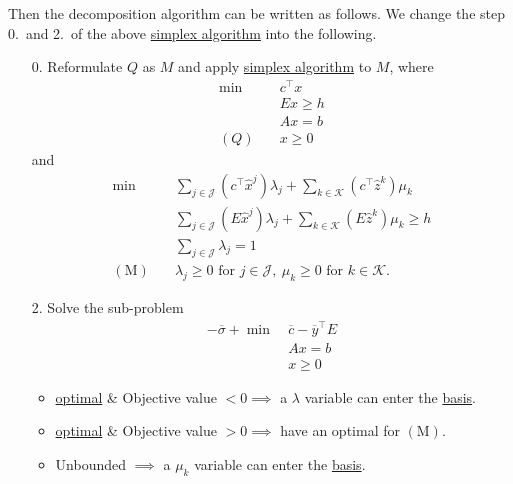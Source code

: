 Then the decomposition algorithm can be written as follows. We change the step 0.\ and 2.\ of the above \hyperref[algo:simplex-algorithm]{simplex algorithm} into the following.
\begin{enumerate}
	\item[0.] Reformulate \(Q\) as \(M\) and apply \hyperref[algo:simplex-algorithm]{simplex algorithm} to \(M\), where
		\[
			\begin{aligned}
				\min~    & c^{\top}x \\
				         & Ex \geq h \\
				         & Ax = b    \\
				(Q)\quad & x\geq 0
			\end{aligned}
		\]
		and
		\[
			\begin{aligned}
				\min~             & \sum\limits_{j\in\mathcal{J}}\left(c^{\top}\hat{x}^j\right)\lambda_{j} + \sum\limits_{k\in\mathcal{K}}\left(c^{\top} \hat{z}^k  \right)\mu_k \\
				                  & \sum\limits_{j\in\mathcal{J}}\left(E\hat{x}^j\right)\lambda_{j} + \sum\limits_{k\in\mathcal{K}}\left(E \hat{z}^k \right)\mu_k \geq h         \\
				                  & \sum\limits_{j\in\mathcal{J}}\lambda_{j} = 1                                                                                                 \\
				(\mathrm{M})\quad & \lambda_{j}\geq 0 \text{ for }j\in\mathcal{J},\ \mu_k\geq 0 \text{ for }k\in\mathcal{K}.
			\end{aligned}
		\]
	\item[2.] Solve the sub-problem
		\[
			\begin{aligned}
				-\overline{\sigma}+\min~ & \overline{c} - \overline{y}^{\top}E \\
				                         & Ax = b                              \\
				                         & x\geq 0
			\end{aligned}
		\]
		\begin{itemize}
			\item \hyperref[def:optimal-solution]{optimal} \& Objective value \(<0 \implies\) a \(\lambda\) variable can enter the \hyperref[def:basis]{basis}.
			\item \hyperref[def:optimal-solution]{optimal} \& Objective value \(>0 \implies\) have an optimal for \((\mathrm{M})\).
			\item Unbounded \(\implies\) a \(\mu_k\) variable can enter the \hyperref[def:basis]{basis}.
		\end{itemize}
\end{enumerate}

